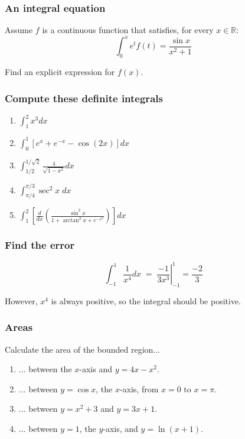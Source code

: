 \documentclass[14pt]{beamer}
\newcommand {\DS} [1] {${\displaystyle #1}$}
\newcommand {\R}{\mathbb{R}}
\begin{document}
\begin{frame}[t]
\frametitle{An integral equation}

Assume $f$ is a continuous function that satisfies, for every $x \in \R$:
	$$
		\int_0^x e^t f(t) = \frac{\sin x}{x^2+1}
	$$

	
Find an explicit expression for $f(x)$.

\end{frame}
\begin{frame}[t]
\frametitle{Compute these definite integrals}

\begin{enumerate}

	\item \DS{\int_1^{2} x^3 dx}
	\vfill
	
	\item \DS{\int_0^{1} \left[ e ^x + e^{-x} - \cos (2x) \right] dx}
	\vfill

	\item \DS{\int_{1/2}^{1/\sqrt{2}} \frac{4}{\sqrt{1-x^2}} dx}
	\vfill

	\item \DS{\int_{\pi/4}^{\pi/3}   \sec^2 x  \; dx}
	\vfill
	
	\item  \DS{\int_1^2 \left[  \frac{d}{dx} \left( \frac{\sin^2 x }{1 + \arctan^2 x + e^{-x^2}}  \right) \right]  dx}
	\vfill
	
\end{enumerate}

\end{frame}
\begin{frame}[t]
\frametitle{Find the error}

	$$
		\int_{-1}^{1} \frac{1}{x^4} dx \; = \; \left. \frac{-1}{3x^3} \right\vert_{-1}^{1} = \frac{-2}{3}
	$$

However, $x^4$ is always positive, so the integral should be positive.

\end{frame}
\begin{frame}[t]
\frametitle{Areas}

Calculate the area of the bounded region...
\vspace{.2cm}
\begin{enumerate}
	\item ... between the $x$-axis and \DS{y=4x-x^2}.
\vspace{.2cm}
	\item ... between $y=\cos x$, the $x$-axis, from $x=0$ to $x=\pi$.
\vspace{.2cm}
	\item ... between \DS{y=x^2+3} and \DS{y=3x+1}.
\vspace{.2cm}
	\item ... between $y=1$, the $y$-axis, and $y=\ln(x+1)$.
\end{enumerate}

\end{frame}
\end{document}
